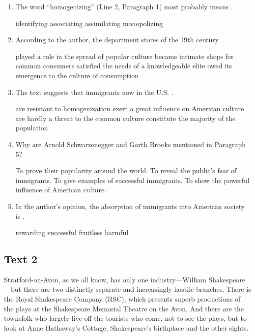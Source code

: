 \begin{enumerate}[resume]
	\item
The word ``homogenizing'' (Line 2, Paragraph 1) most
probably means \lineread.

\fourchoices
{identifying}
{associating}
{assimilating}
{monopolizing}



\item
According to the author, the department stores of the 19th
century \lineread.

\fourchoices
{played a role in the spread of popular culture}
{became intimate shops for common consumers}
{satisfied the needs of a knowledgeable elite}
{owed its emergence to the culture of consumption}


\item
The text suggests that immigrants now in the U.S.
\lineread .

\fourchoices
{are resistant to homogenization}
{exert a great influence on American culture}
{are hardly a threat to the common culture}
{constitute the majority of the population}



\item
Why are Arnold Schwarzenegger and Garth Brooks mentioned in
Paragraph 5?

\fourchoices
{To prove their popularity around the world.}
{To reveal the public's fear of immigrants.}
{To give examples of successful immigrants.}
{To show the powerful influence of American culture.}



\item
 In the author's opinion, the absorption of immigrants into
American society is \lineread.

\fourchoices
{rewarding}
{successful}
{fruitless}
{harmful}


\end{enumerate}

\newpage
\subsection{Text 2}


Stratford-on-Avon, as we all know, has only one industry---William
Shakespeare---but there are two distinctly separate and increasingly
hostile branches. There is the Royal Shakespeare Company (RSC), which
presents superb productions of the plays at the Shakespeare Memorial
Theatre on the Avon. And there are the townsfolk who largely live off
the tourists who come, not to see the plays, but to look at Anne
Hathaway's Cottage, Shakespeare's birthplace and the other sights.

